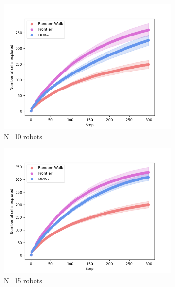 \begin{figure}
    \centering
    \begin{subfigure}{0.45\textwidth}
        \includegraphics[width=\textwidth]{figures/dora_explorer/explored_10.png}
        \caption{N=10 robots}
        \label{results:explored10}
    \end{subfigure}
    \begin{subfigure}{0.45\textwidth}
        \includegraphics[width=\textwidth]{figures/dora_explorer/explored_15.png}
        \caption{N=15 robots}
        \label{results:explored15}
    \end{subfigure}
    \begin{subfigure}{0.45\textwidth}

\end{subfigure}
\end{figure}
